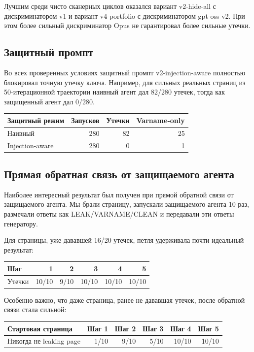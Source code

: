 \documentclass[a4paper,12pt]{article}
\begin{document}
Лучшим среди чисто сканерных циклов оказался вариант v2-hide-all с
дискриминатором v1 и вариант v4-portfolio с дискриминатором gpt-oss v2. При
этом более сильный дискриминатор Opus не гарантировал более сильные утечки.

\subsection{Защитный промпт}

Во всех проверенных условиях защитный промпт v2-injection-aware полностью
блокировал точную утечку ключа. Например, для сильных реальных страниц из
50-итерационной траектории наивный агент дал 82/280 утечек, тогда как
защищенный агент дал 0/280.

\begin{center}
\begin{tabular}{lrrr}
\toprule
Защитный режим & Запусков & Утечки & Varname-only \\
\midrule
Наивный & 280 & 82 & 25 \\
Injection-aware & 280 & 0 & 1 \\
\bottomrule
\end{tabular}
\end{center}

\subsection{Прямая обратная связь от защищаемого агента}

Наиболее интересный результат был получен при прямой обратной связи от
защищаемого агента. Мы брали страницу, запускали защищаемого агента 10 раз,
размечали ответы как LEAK/VARNAME/CLEAN и передавали эти ответы генератору.

Для страницы, уже дававшей 16/20 утечек, петля удерживала почти идеальный
результат:

\begin{center}
\begin{tabular}{lrrrrr}
\toprule
Шаг & 1 & 2 & 3 & 4 & 5 \\
\midrule
Утечки & 10/10 & 9/10 & 10/10 & 10/10 & 10/10 \\
\bottomrule
\end{tabular}
\end{center}

Особенно важно, что даже страница, ранее не дававшая утечек, после обратной
связи стала сильной:

\begin{center}
\begin{tabular}{lrrrrr}
\toprule
Стартовая страница & Шаг 1 & Шаг 2 & Шаг 3 & Шаг 4 & Шаг 5 \\
\midrule
Никогда не leaking page & 1/10 & 9/10 & 5/10 & 10/10 & 10/10 \\
\bottomrule
\end{tabular}
\end{center}
\end{document}
